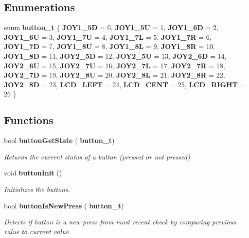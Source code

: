 \subsection*{Enumerations}
\begin{DoxyCompactItemize}
\item 
enum \textbf{ button\+\_\+t} \{ \newline
\textbf{ J\+O\+Y1\+\_\+5D} = 0, 
\textbf{ J\+O\+Y1\+\_\+5U} = 1, 
\textbf{ J\+O\+Y1\+\_\+6D} = 2, 
\textbf{ J\+O\+Y1\+\_\+6U} = 3, 
\newline
\textbf{ J\+O\+Y1\+\_\+7U} = 4, 
\textbf{ J\+O\+Y1\+\_\+7L} = 5, 
\textbf{ J\+O\+Y1\+\_\+7R} = 6, 
\textbf{ J\+O\+Y1\+\_\+7D} = 7, 
\newline
\textbf{ J\+O\+Y1\+\_\+8U} = 8, 
\textbf{ J\+O\+Y1\+\_\+8L} = 9, 
\textbf{ J\+O\+Y1\+\_\+8R} = 10, 
\textbf{ J\+O\+Y1\+\_\+8D} = 11, 
\newline
\textbf{ J\+O\+Y2\+\_\+5D} = 12, 
\textbf{ J\+O\+Y2\+\_\+5U} = 13, 
\textbf{ J\+O\+Y2\+\_\+6D} = 14, 
\textbf{ J\+O\+Y2\+\_\+6U} = 15, 
\newline
\textbf{ J\+O\+Y2\+\_\+7U} = 16, 
\textbf{ J\+O\+Y2\+\_\+7L} = 17, 
\textbf{ J\+O\+Y2\+\_\+7R} = 18, 
\textbf{ J\+O\+Y2\+\_\+7D} = 19, 
\newline
\textbf{ J\+O\+Y2\+\_\+8U} = 20, 
\textbf{ J\+O\+Y2\+\_\+8L} = 21, 
\textbf{ J\+O\+Y2\+\_\+8R} = 22, 
\textbf{ J\+O\+Y2\+\_\+8D} = 23, 
\newline
\textbf{ L\+C\+D\+\_\+\+L\+E\+FT} = 24, 
\textbf{ L\+C\+D\+\_\+\+C\+E\+NT} = 25, 
\textbf{ L\+C\+D\+\_\+\+R\+I\+G\+HT} = 26
 \}
\end{DoxyCompactItemize}
\subsection*{Functions}
\begin{DoxyCompactItemize}
\item 
bool \textbf{ button\+Get\+State} (\textbf{ button\+\_\+t})
\begin{DoxyCompactList}\small\item\em Returns the current status of a button (pressed or not pressed) \end{DoxyCompactList}\item 
void \textbf{ button\+Init} ()
\begin{DoxyCompactList}\small\item\em Initializes the buttons. \end{DoxyCompactList}\item 
bool \textbf{ button\+Is\+New\+Press} (\textbf{ button\+\_\+t})
\begin{DoxyCompactList}\small\item\em Detects if button is a new press from most recent check by comparing previous value to current value. \end{DoxyCompactList}\end{DoxyCompactItemize}


